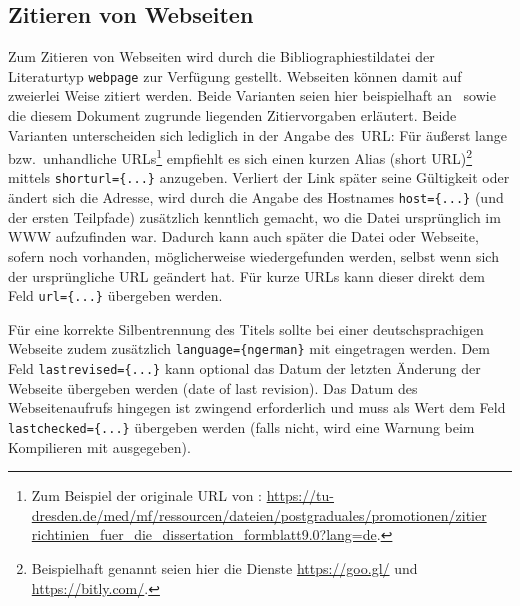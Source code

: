 \documentclass[a4paper,10pt]{scrartcl}
\renewcommand{\cite}{\citep}  %
\begin{document}
\subsection{Zitieren von Webseiten}
Zum Zitieren von Webseiten wird durch die Bibliographiestildatei
der Literaturtyp \verb|webpage| zur Verfügung gestellt. Webseiten können
damit auf zweierlei Weise zitiert werden. Beide Varianten seien hier
beispielhaft an~ sowie die diesem Dokument
zugrunde liegenden Zitiervorgaben
 erläutert. Beide Varianten unterscheiden sich
lediglich in der Angabe des~URL: Für äußerst lange bzw.\ unhandliche
URLs\footnote{Zum
Beispiel der originale URL von \cite{Bilz2013}: \url{
https://tu-dresden.de/med/mf/ressourcen/dateien/postgraduales/promotionen/zitier
richtinien_fuer_die_dissertation_formblatt9.0?lang=de}.} empfiehlt es sich
einen kurzen Alias (short URL)\footnote{Beispielhaft genannt seien hier die
Dienste \url{https://goo.gl/} und \url{https://bitly.com/}.} mittels
\verb|shorturl={...}| anzugeben. Verliert der Link später seine Gültigkeit oder
ändert sich die Adresse, wird durch die Angabe des Hostnames \verb|host={...}|
(und der ersten Teilpfade) zusätzlich kenntlich gemacht, wo die Datei
ursprünglich im WWW aufzufinden war. Dadurch kann auch später die Datei oder
Webseite, sofern noch vorhanden, möglicherweise wiedergefunden werden, selbst
wenn sich der ursprüngliche URL geändert hat. Für kurze URLs kann dieser direkt
dem Feld \verb|url={...}| übergeben werden.

Für eine korrekte Silbentrennung  des Titels sollte bei einer deutschsprachigen
Webseite zudem zusätzlich
\verb|language={ngerman}| mit eingetragen werden. Dem Feld
\verb|lastrevised={...}|
kann optional das Datum der letzten Änderung der Webseite übergeben werden
(date of last revision). Das Datum des Webseitenaufrufs hingegen ist zwingend
erforderlich und muss als Wert dem Feld
\verb|lastchecked={...}| übergeben werden (falls nicht, wird eine
Warnung beim Kompilieren mit  ausgegeben).
\end{document}
